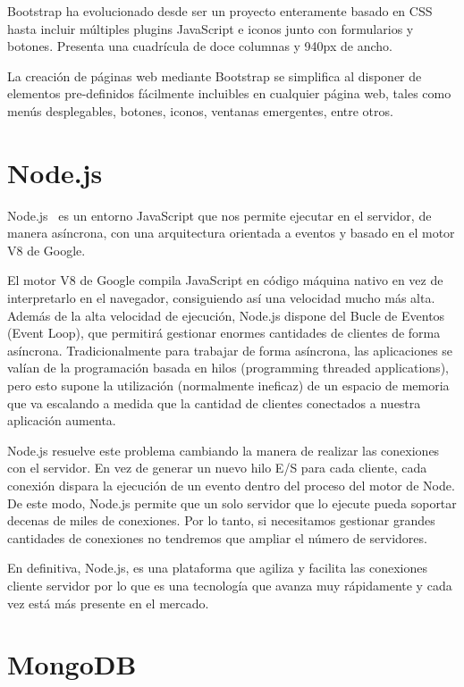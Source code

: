\documentclass[a4paper, 12pt]{book}
\begin{document}
	Bootstrap ha evolucionado desde ser un proyecto enteramente basado en CSS hasta incluir múltiples plugins JavaScript e iconos junto con formularios y botones. Presenta una cuadrícula de doce columnas y 940px de ancho.

	La creación de páginas web mediante Bootstrap se simplifica al disponer de elementos pre-definidos fácilmente incluibles en cualquier página web, tales como menús desplegables, botones, iconos, ventanas emergentes, entre otros.

\section{Node.js} 
\label{sec:Node}
	Node.js~\cite{node} es un entorno JavaScript que nos permite ejecutar en el servidor, de manera asíncrona, con una arquitectura orientada a eventos y basado en el motor V8 de Google.
	
	El motor V8 de Google compila JavaScript en código máquina nativo en vez de interpretarlo en el navegador, consiguiendo así una velocidad mucho más alta. Además de la alta velocidad de ejecución, Node.js dispone del Bucle de Eventos (Event Loop), que permitirá gestionar enormes cantidades de clientes de forma asíncrona. Tradicionalmente para trabajar de forma asíncrona, las aplicaciones se valían de la programación basada en hilos (programming threaded applications), pero esto supone la utilización (normalmente ineficaz) de un espacio de memoria que va escalando a medida que la cantidad de clientes conectados a nuestra aplicación aumenta.
	
	Node.js resuelve este problema cambiando la manera de realizar las conexiones con el servidor. En vez de generar un nuevo hilo E/S para cada cliente, cada conexión dispara la ejecución de un evento dentro del proceso del motor de Node. De este modo, Node.js permite que un solo servidor que lo ejecute pueda soportar decenas de miles de conexiones. Por lo tanto, si necesitamos gestionar grandes cantidades de conexiones no tendremos que ampliar el número de servidores.

	En definitiva, Node.js, es una plataforma que agiliza y facilita las conexiones cliente servidor por lo que es una tecnología que avanza muy rápidamente y cada vez está más presente en el mercado.

\section{MongoDB} 
\label{sec:MongoDB}
\end{document}
